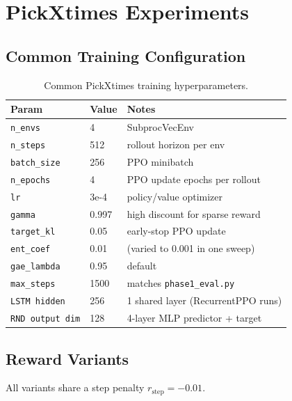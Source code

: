 \documentclass[11pt,letterpaper]{article}
\begin{document}
\section{PickXtimes Experiments}
\label{sec:pickxtimes}

\subsection{Common Training Configuration}

\begin{table}[H]
\centering
\begin{tabular}{lll}
\toprule
\textbf{Param} & \textbf{Value} & \textbf{Notes} \\
\midrule
\texttt{n\_envs} & 4 & SubprocVecEnv \\
\texttt{n\_steps} & 512 & rollout horizon per env \\
\texttt{batch\_size} & 256 & PPO minibatch \\
\texttt{n\_epochs} & 4 & PPO update epochs per rollout \\
\texttt{lr} & 3e-4 & policy/value optimizer \\
\texttt{gamma} & 0.997 & high discount for sparse reward \\
\texttt{target\_kl} & 0.05 & early-stop PPO update \\
\texttt{ent\_coef} & 0.01 & (varied to 0.001 in one sweep) \\
\texttt{gae\_lambda} & 0.95 & default \\
\texttt{max\_steps} & 1500 & matches \texttt{phase1\_eval.py} \\
\texttt{LSTM hidden} & 256 & 1 shared layer (RecurrentPPO runs) \\
\texttt{RND output dim} & 128 & 4-layer MLP predictor + target \\
\bottomrule
\end{tabular}
\caption{Common PickXtimes training hyperparameters.}
\end{table}

\subsection{Reward Variants}
\label{sec:reward-variants}

All variants share a step penalty $r_\text{step} = -0.01$.
\end{document}

